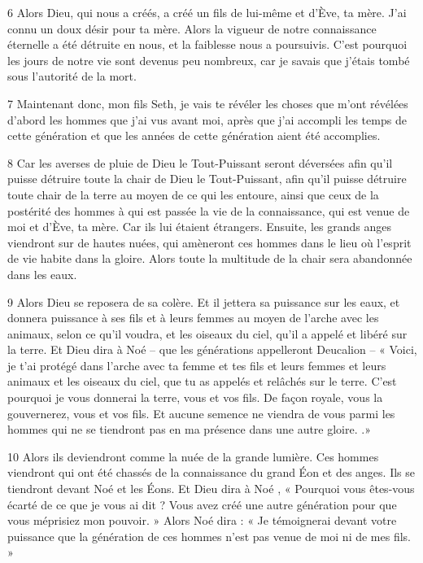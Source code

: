 \par 6 Alors Dieu, qui nous a créés, a créé un fils de lui-même et d'Ève, ta mère. J'ai connu un doux désir pour ta mère. Alors la vigueur de notre connaissance éternelle a été détruite en nous, et la faiblesse nous a poursuivis. C'est pourquoi les jours de notre vie sont devenus peu nombreux, car je savais que j'étais tombé sous l'autorité de la mort.

\par 7 Maintenant donc, mon fils Seth, je vais te révéler les choses que m'ont révélées d'abord les hommes que j'ai vus avant moi, après que j'ai accompli les temps de cette génération et que les années de cette génération aient été accomplies.

\par 8 Car les averses de pluie de Dieu le Tout-Puissant seront déversées afin qu'il puisse détruire toute la chair de Dieu le Tout-Puissant, afin qu'il puisse détruire toute chair de la terre au moyen de ce qui les entoure, ainsi que ceux de la postérité des hommes à qui est passée la vie de la connaissance, qui est venue de moi et d'Ève, ta mère. Car ils lui étaient étrangers. Ensuite, les grands anges viendront sur de hautes nuées, qui amèneront ces hommes dans le lieu où l'esprit de vie habite dans la gloire. Alors toute la multitude de la chair sera abandonnée dans les eaux.

\par 9 Alors Dieu se reposera de sa colère. Et il jettera sa puissance sur les eaux, et donnera puissance à ses fils et à leurs femmes au moyen de l'arche avec les animaux, selon ce qu'il voudra, et les oiseaux du ciel, qu'il a appelé et libéré sur la terre. Et Dieu dira à Noé – que les générations appelleront Deucalion – « Voici, je t’ai protégé dans l’arche avec ta femme et tes fils et leurs femmes et leurs animaux et les oiseaux du ciel, que tu as appelés et relâchés sur le terre. C'est pourquoi je vous donnerai la terre, vous et vos fils. De façon royale, vous la gouvernerez, vous et vos fils. Et aucune semence ne viendra de vous parmi les hommes qui ne se tiendront pas en ma présence dans une autre gloire. .»

\par 10 Alors ils deviendront comme la nuée de la grande lumière. Ces hommes viendront qui ont été chassés de la connaissance du grand Éon et des anges. Ils se tiendront devant Noé et les Éons. Et Dieu dira à Noé , « Pourquoi vous êtes-vous écarté de ce que je vous ai dit ? Vous avez créé une autre génération pour que vous méprisiez mon pouvoir. » Alors Noé dira : « Je témoignerai devant votre puissance que la génération de ces hommes n'est pas venue de moi ni de mes fils. »

